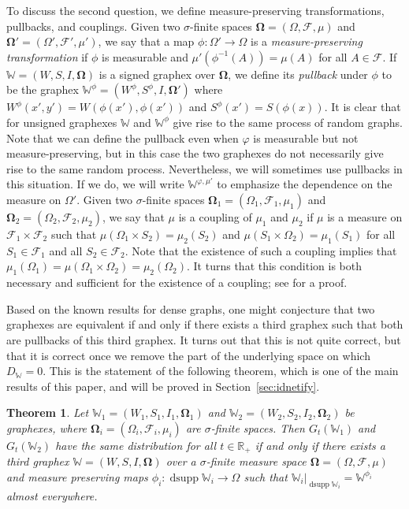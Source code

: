 \documentclass{amsart}
\numberwithin{equation}{section}
\numberwithin{figure}{section}
\newtheorem{theorem}{Theorem}[section]
\theoremstyle{definition}
\theoremstyle{remark}
\DeclareMathOperator{\dsupp}{dsupp}
\newcommand{\bOmega}{{\mathbf{\Omega}}}
\newcommand{\RR}{\mathbb{R}}
\newcommand{\cW}{\mathbb{W}}
\newcommand{\cF}{\mathcal{F}}
\begin{document}
To discuss the second question, we define measure-preserving transformations,
pullbacks, and couplings. Given two $\sigma$-finite spaces
$\bOmega=(\Omega,\cF,\mu)$ and $\bOmega'=(\Omega',\cF',\mu')$, we say that a
map $\phi\colon \Omega'\to\Omega$ is a \emph{measure-preserving
transformation} if $\phi$ is measurable and $\mu'(\phi^{-1}(A))=\mu(A)$ for
all $A\in \cF$. If $\cW=(W,S,I,\bOmega)$ is a signed graphex over $\bOmega$,
we define its \emph{pullback} under $\phi$ to be the graphex
$\cW^\phi=(W^\phi,S^\phi,I,\bOmega')$ where
$W^\phi(x',y')=W(\phi(x'),\phi(x'))$ and $S^\phi(x')=S(\phi(x))$. It is clear
that for unsigned graphexes $\cW$ and $\cW^\phi$ give rise to the same
process of random graphs. Note that we can define the pullback even when
$\varphi$ is measurable but not measure-preserving, but in this case the two
graphexes do not necessarily give rise to the same random process.
Nevertheless, we will sometimes use pullbacks in this situation. If we do, we
will write $\cW^{\varphi,\mu'}$ to emphasize the dependence on the measure on
$\Omega'$. Given two $\sigma$-finite spaces
$\bOmega_1=(\Omega_1,\cF_1,\mu_1)$ and $\bOmega_2=(\Omega_2,\cF_2,\mu_2)$, we
say that $\mu$ is a coupling of $\mu_1$ and $\mu_2$ if $\mu$ is a measure on
$\cF_1\times\cF_2$ such that $\mu(\Omega_1\times S_2)=\mu_2(S_2)$ and
$\mu(S_1\times\Omega_2)=\mu_1(S_1)$ for all $S_1\in\cF_1$ and all
$S_2\in\cF_2$. Note that the existence of such a coupling implies that
$\mu_1(\Omega_1)=\mu(\Omega_1\times\Omega_2)=\mu_2(\Omega_2)$. It turns that
this condition is both necessary and sufficient for the existence of a
coupling; see \cite{BCCH16} for a proof.

Based on the known results for dense graphs, one might conjecture that two
graphexes are equivalent if and only if there exists a third graphex such
that both are pullbacks of this third graphex. It turns out that this is not
quite correct, but that it is correct once we remove the part of the
underlying space on which $D_\cW=0$. This is the statement of the following
theorem, which is one of the main results of this paper, and will be proved
in Section~\ref{sec:idnetify}.

\begin{theorem} \label{thm:identify}
Let $\cW_1=(W_1,S_1,I_1,\bOmega_1)$ and $\cW_2=(W_2,S_2,I_2,\bOmega_2)$ be
graphexes, where $\bOmega_i=(\Omega_i,\cF_i,\mu_i)$ are $\sigma$-finite
spaces. Then $G_t(\cW_1)$ and $G_t(\cW_2)$ have the same distribution for all
$t\in\RR_+$ if and only if there exists a third graphex $\cW=(W,S,I,\bOmega)$
over a $\sigma$-finite measure space $\bOmega=(\Omega,\cF,\mu)$ and measure
preserving maps $\phi_i\colon\dsupp \cW_i \rightarrow \Omega$ such that
$\cW_i|_{\dsupp \cW_i} =\cW^{\phi_i}$ almost everywhere.
\end{theorem}
\end{document}
